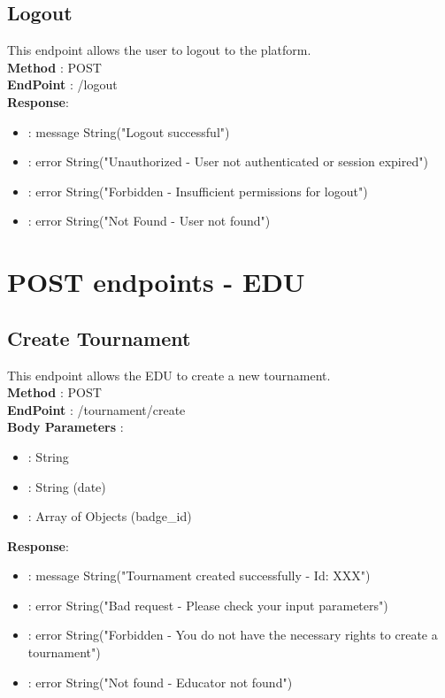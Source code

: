 \subsection*{Logout}
This endpoint allows the user to logout to the platform.\\
\textbf{Method} : POST \\
\textbf{EndPoint} : /logout \\
\textbf{Response}:
\begin{itemize}
    \item {} : message String("Logout successful")
    \item {} : error String("Unauthorized - User not authenticated or session expired")
    \item {} : error String("Forbidden - Insufficient permissions for logout")
    \item {} : error String("Not Found - User not found")
\end{itemize}

\section*{POST endpoints - EDU}
\subsection*{Create Tournament}
This endpoint allows the EDU to create a new tournament.\\
\textbf{Method} : POST \\
\textbf{EndPoint} : /tournament/create \\
\textbf{Body Parameters} :
\begin{itemize}
    \item {} : String
    \item {} : String (date)
    \item {} : Array of Objects (badge\_id)
\end{itemize}
\textbf{Response}:
\begin{itemize}
    \item {} : message String("Tournament created successfully - Id: XXX")
    \item {} : error String("Bad request - Please check your input parameters")
    \item {} : error String("Forbidden - You do not have the necessary rights to create a tournament")
    \item {} : error String("Not found - Educator not found")
\end{itemize}

